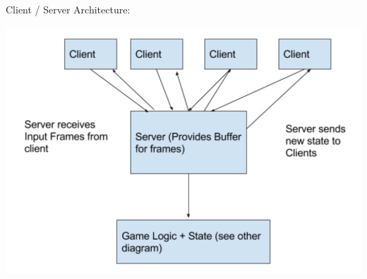 \documentclass[11pt, oneside]{article}   	%
\begin{document}
\clearpage

Client / Server Architecture:\\
\begin{center}
\includegraphics[scale=0.7]{images/client-server-architecture.png}
\end{center}
\end{document}
